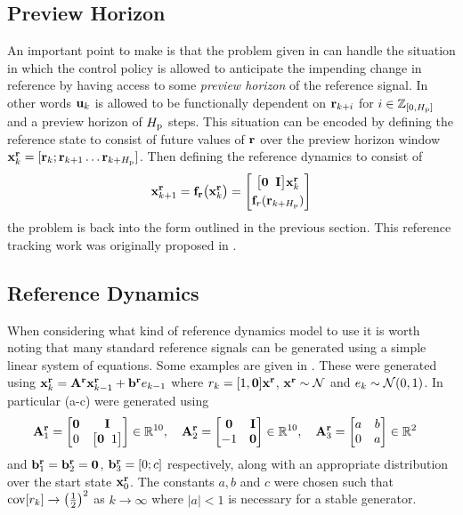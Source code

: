 \subsection{Preview Horizon}
An important point to make is that the problem given in  can handle the situation in which the control policy is allowed to anticipate the impending change in reference by having access to some \textit{preview horizon} of the reference signal. In other words $\mathbf{u}_k$ is allowed to be functionally dependent on $\mathbf{r}_{k+i}$ for $i \in \mathbb{Z}_{[0,H_{\text{p}}]}$ and a preview horizon of $H_{\text{p}}$ steps. This situation can be encoded by defining the reference state to consist of future values of $\mathbf{r}$ over the preview horizon window $\mathbf{x}^{\mathbf{r}}_k = [\mathbf{r}_k; \mathbf{r}_{k+1} \dots \mathbf{r}_{k+H_{\text{p}}}]$. Then defining the reference dynamics to consist of
\begin{equation*}
\mathbf{x}^{\mathbf{r}}_{k+1} = \mathbf{f}_{\mathbf{r}}\big( \mathbf{x}^{\mathbf{r}}_{k} \big) = \begin{bmatrix} 
\big[\mathbf{0} \;\; \mathbf{I}\big] \mathbf{x}^{\mathbf{r}}_{k} \\[0.1cm]
\mathbf{f}_{r}(\mathbf{r}_{k+H_{\text{p}}})
 \end{bmatrix}
\end{equation*}
the problem is back into the form outlined in the previous section. This reference tracking work was originally proposed in \cite{HRM11}.









\subsection{Reference Dynamics}

When considering what kind of reference dynamics model to use it is worth noting that many standard reference signals can be generated using a simple linear system of equations. Some examples are given in . These were generated using $\mathbf{x}^{\mathbf{r}}_k = \mathbf{A}^{\mathbf{r}}\mathbf{x}^{\mathbf{r}}_{k-1} + \mathbf{b} ^{\mathbf{r}}e_{k-1}$ where $r_k = [1,\mathbf{0}]\mathbf{x}^{\mathbf{r}}$, $\mathbf{x}^{\mathbf{r}} \sim \mathcal{N}$ and $e_k \sim \mathcal{N}(0,1)$. In particular (a-c) were generated using 
\begin{align*}
\mathbf{A}_1^{\mathbf{r}} &= \begin{bmatrix} \mathbf{0} & \mathbf{I} \\ 0 & \big[\mathbf{0} \;\; 1\big] \end{bmatrix} \in \mathbb{R}^{10}, \quad
\mathbf{A}_2^{\mathbf{r}} = \begin{bmatrix} \mathbf{0} & \mathbf{I} \\ -1 & \mathbf{0} \end{bmatrix} \in \mathbb{R}^{10}, \quad
\mathbf{A}_3^{\mathbf{r}} = \begin{bmatrix} a & b \\ 0 & a \end{bmatrix} \in \mathbb{R}^{2} 
\end{align*}
and $\mathbf{b}_1^{\mathbf{r}} = \mathbf{b}_2^{\mathbf{r}} = \mathbf{0}$, $\mathbf{b}_3^{\mathbf{r}} = [0;c]$ respectively, along with an appropriate distribution over the start state $\mathbf{x}^{\mathbf{r}}_0$. The constants $a,b$ and $c$ were chosen such that $\mathrm{cov}[r_k] \rightarrow \big(\tfrac{1}{2}\big)^2$ as $k \rightarrow \infty$ where $|a| <1$ is necessary for a stable generator.



